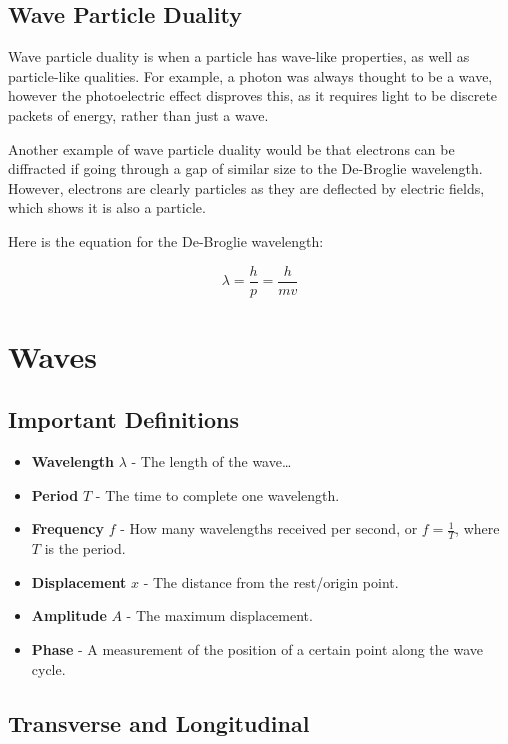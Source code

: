 \documentclass[a4paper, 12pt]{article}
\begin{document}
\subsection{Wave Particle Duality}

Wave particle duality is when a particle has wave-like properties, as well as particle-like qualities. For example, a photon was always thought to be a wave, however the photoelectric effect disproves this, as it requires light to be discrete packets of energy, rather than just a wave.

Another example of wave particle duality would be that electrons can be diffracted if going through a gap of similar size to the De-Broglie wavelength. However, electrons are clearly particles as they are deflected by electric fields, which shows it is also a particle.

Here is the equation for the De-Broglie wavelength:

$$
\lambda = \frac{h}{p} = \frac{h}{mv}
$$

\newpage
\section{Waves}

\subsection{Important Definitions}

\begin{itemize}
	\item{\textbf{Wavelength} $\lambda$ - The length of the wave\dots}
	\item{\textbf{Period} $T$ - The time to complete one wavelength.}
	\item{\textbf{Frequency} $f$ - How many wavelengths received per second, or {$f = \frac{1}{T}$}, where $T$ is the period.}
	\item{\textbf{Displacement} $x$ - The distance from the rest/origin point.}
	\item{\textbf{Amplitude} $A$ - The maximum displacement.}
	\item{\textbf{Phase} - A measurement of the position of a certain point along the wave cycle.}
\end{itemize}

\subsection{Transverse and Longitudinal}
\end{document}

